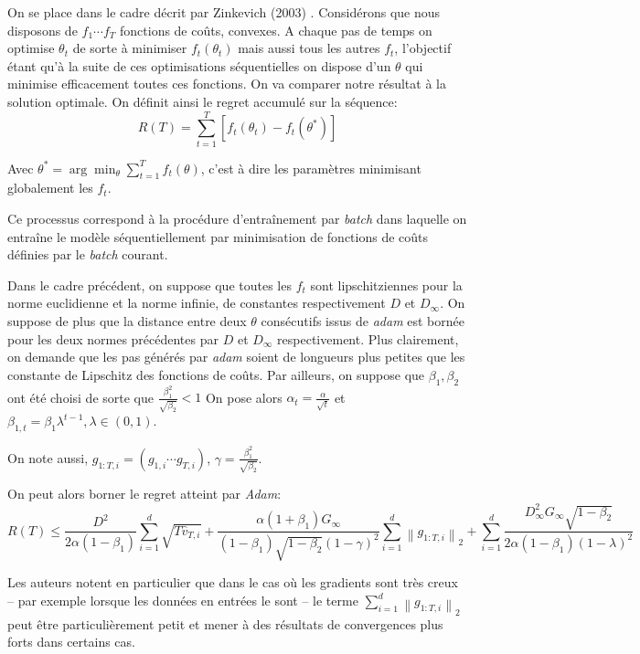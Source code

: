 \documentclass[fleqn,11pt, titlepage, french]{article}
\begin{document}
	On se place dans le cadre décrit par Zinkevich (2003) \cite{zinka}. Considérons que nous disposons de $f_1 \cdots f_T$ fonctions de coûts, convexes. A chaque pas de temps on optimise $\theta_t$ de sorte à minimiser $f_t(\theta_t)$ mais aussi tous les autres $f_t$, l'objectif étant qu'à la suite de ces optimisations séquentielles on dispose d'un $\theta$ qui minimise efficacement toutes ces fonctions.  On va comparer notre résultat à la solution optimale. On définit ainsi le regret accumulé sur la séquence:
	\[R(T)=\sum_{t=1}^{T}\left[f_{t}\left(\theta_{t}\right)-f_{t}\left(\theta^{*}\right)\right]\]
	
	Avec $\theta^* = \arg\min_{\theta} \sum_{t=1}^T f_t(\theta)$, c'est à dire les paramètres minimisant globalement les $f_t$.
	
	Ce processus correspond à la procédure d'entraînement par \emph{batch} dans laquelle on entraîne le modèle séquentiellement par minimisation de fonctions de coûts définies par le \emph{batch} courant.
	
	Dans le cadre précédent, on suppose que toutes les $f_t$ sont lipschitziennes pour la norme euclidienne et la norme infinie, de constantes respectivement $D$ et $D_\infty$. On suppose de plus que la distance entre deux $\theta$ consécutifs issus de \emph{adam} est bornée pour les deux normes précédentes par $D$ et $D_\infty$ respectivement. Plus clairement, on demande que les pas générés par \emph{adam} soient de longueurs plus petites que les constante de Lipschitz des fonctions de coûts. Par ailleurs, on suppose que $\beta_{1}, \beta_{2}$ ont été choisi de sorte que $\frac{\beta_{1}^{2}}{\sqrt{\beta_{2}}}<1$
	On pose alors $\alpha_{t}=\frac{\alpha}{\sqrt{t}}$ et $ \beta_{1, t}=\beta_{1} \lambda^{t-1}, \lambda \in(0,1)$. 
	
	On note aussi, $g_{1:T, i} = (g_{1,i} \cdots g_{T,i})$, $\gamma = \frac{\beta_1^2}{\sqrt{\beta_2}}$.
	
	On peut alors borner le regret atteint par \emph{Adam}:
	\[R(T) \leq \frac{D^{2}}{2 \alpha\left(1-\beta_{1}\right)} \sum_{i=1}^{d} \sqrt{T \widehat{v}_{T, i}}+\frac{\alpha\left(1+\beta_{1}\right) G_{\infty}}{\left(1-\beta_{1}\right) \sqrt{1-\beta_{2}}(1-\gamma)^{2}} \sum_{i=1}^{d}\left\|g_{1: T, i}\right\|_{2}+\sum_{i=1}^{d} \frac{D_{\infty}^{2} G_{\infty} \sqrt{1-\beta_{2}}}{2 \alpha\left(1-\beta_{1}\right)(1-\lambda)^{2}}\]
	
	Les auteurs notent en particulier que dans le cas où les gradients sont très creux -- par exemple lorsque les données en entrées le sont -- le terme $\sum_{i=1}^{d}\left\|g_{1: T, i}\right\|_{2}$ peut être particulièrement petit et mener à des résultats de convergences plus forts dans certains cas.
	
\end{document}

